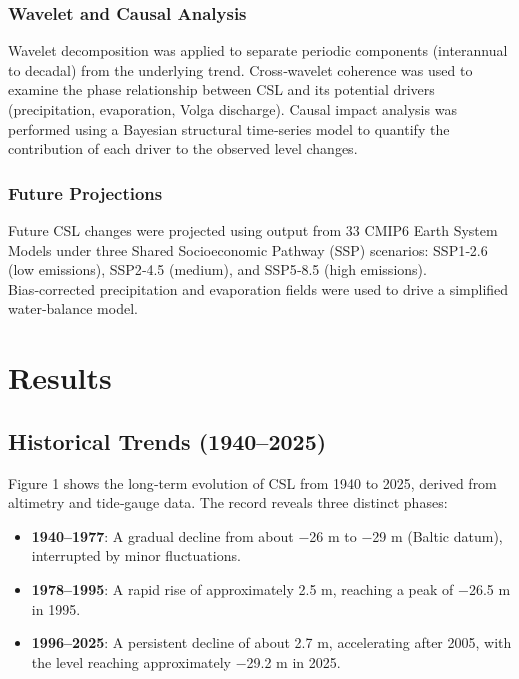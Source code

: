 \documentclass[12pt,a4paper]{article}
\begin{document}
\subsubsection{Wavelet and Causal Analysis}

Wavelet decomposition was applied to separate periodic components (interannual to decadal) from the underlying trend. Cross‑wavelet coherence was used to examine the phase relationship between CSL and its potential drivers (precipitation, evaporation, Volga discharge). Causal impact analysis was performed using a Bayesian structural time‑series model to quantify the contribution of each driver to the observed level changes.

\subsubsection{Future Projections}

Future CSL changes were projected using output from 33 CMIP6 Earth System Models under three Shared Socioeconomic Pathway (SSP) scenarios: SSP1‑2.6 (low emissions), SSP2‑4.5 (medium), and SSP5‑8.5 (high emissions). Bias‑corrected precipitation and evaporation fields were used to drive a simplified water‑balance model.

\section{Results}

\subsection{Historical Trends (1940–2025)}

Figure 1 shows the long‑term evolution of CSL from 1940 to 2025, derived from altimetry and tide‑gauge data. The record reveals three distinct phases:

\begin{itemize}
    \item \textbf{1940–1977}: A gradual decline from about −26 m to −29 m (Baltic datum), interrupted by minor fluctuations.
    \item \textbf{1978–1995}: A rapid rise of approximately 2.5 m, reaching a peak of −26.5 m in 1995.
    \item \textbf{1996–2025}: A persistent decline of about 2.7 m, accelerating after 2005, with the level reaching approximately −29.2 m in 2025.
\end{itemize}
\end{document}
